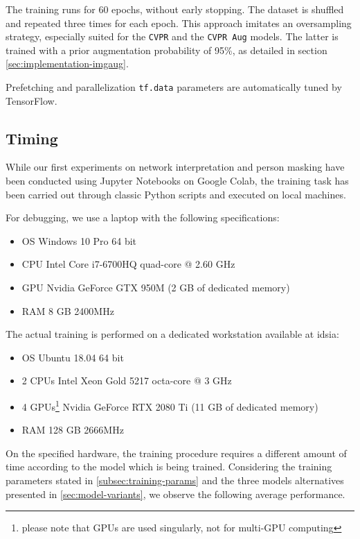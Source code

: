The training runs for 60 epochs, without early stopping. The dataset is shuffled and repeated three times for each epoch. This approach imitates an oversampling strategy, especially suited for the \texttt{CVPR} and the \texttt{CVPR Aug} models. The latter is trained with a prior augmentation probability of 95\%, as detailed in section \ref{sec:implementation-imgaug}.

Prefetching and parallelization \texttt{tf.data} parameters are automatically tuned by TensorFlow.



\subsection{Timing}
\label{subsec:training-timing}

While our first experiments on network interpretation and person masking have been conducted using Jupyter Notebooks on Google Colab, the training task has been carried out through classic Python scripts and executed on local machines.

\medskip

For debugging, we use a laptop with the following specifications:
\begin{itemize}
    \item OS Windows 10 Pro 64 bit
    \item CPU Intel Core i7-6700HQ quad-core @ 2.60 GHz
    \item GPU Nvidia GeForce GTX 950M (2 GB of dedicated memory)
    \item RAM 8 GB 2400MHz
\end{itemize}

The actual training is performed on a dedicated workstation available at \gls{idsia}:
\begin{itemize}
    \item OS Ubuntu 18.04 64 bit
    \item 2 CPUs Intel Xeon Gold 5217 octa-core @ 3 GHz
    \item 4 GPUs\footnote{please note that GPUs are used singularly, not for multi-GPU computing} Nvidia GeForce RTX 2080 Ti (11 GB of dedicated memory)
    \item RAM 128 GB 2666MHz
\end{itemize}

\medskip
    
On the specified hardware, the training procedure requires a different amount of time according to the model which is being trained. Considering the training parameters stated in \ref{subsec:training-params} and the three models alternatives presented in \ref{sec:model-variants}, we observe the following average performance.

